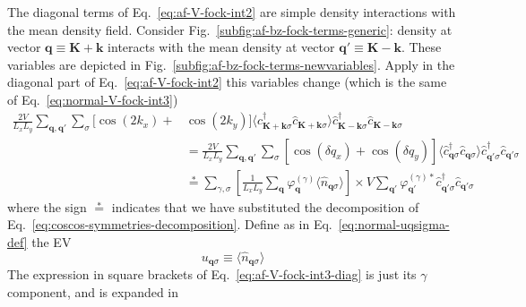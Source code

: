The diagonal terms of Eq.~\eqref{eq:af-V-fock-int2} are simple density interactions with the mean density field. Consider Fig.~\ref{subfig:af-bz-fock-terms-generic}: density at vector $\mathbf{q}\equiv\mathbf{K}+\mathbf{k}$ interacts with the mean density at vector $\mathbf{q}'\equiv\mathbf{K}-\mathbf{k}$. These variables are depicted in Fig.~\ref{subfig:af-bz-fock-terms-newvariables}. Apply in the diagonal part of Eq.~\eqref{eq:af-V-fock-int2} this variables change (which is the same of Eq.~\eqref{eq:normal-V-fock-int3})
\begin{align}
	\frac{2V}{L_x L_y} \sum_{\mathbf{q}, \mathbf{q}'} \sum_\sigma [
		\cos \left(
			2k_x
		\right)	+ &\cos \left(
			2k_y
		\right)	
	] \langle
		\hat c_{\mathbf{K}+\mathbf{k} \sigma}^\dagger 
		\hat c_{\mathbf{K}+\mathbf{k} \sigma}
	\rangle
	\hat c_{\mathbf{K}-\mathbf{k} \sigma}^\dagger \hat c_{\mathbf{K}-\mathbf{k}\sigma} \nonumber \\
	&= \frac{2V}{L_x L_y} \sum_{\mathbf{q}, \mathbf{q}'} \sum_\sigma \left[
		\cos \left( \delta q_x \right) + \cos \left( \delta q_y \right)
	\right] \langle
		\hat c_{\mathbf{q}\sigma}^\dagger \hat c_{\mathbf{q}\sigma} 
	\rangle
	\hat c_{\mathbf{q}'\sigma}^\dagger \hat c_{\mathbf{q}'\sigma}
	\nonumber \\
	&\stackrel{*}{=} \sum_{\gamma,\sigma} \left[
		\frac{1}{L_x L_y} \sum_\mathbf{q} \varphi_\mathbf{q}^{(\gamma)}
		\langle
			\hat n_{\mathbf{q}\sigma}
		\rangle
	\right] \times V
	\sum_{\mathbf{q}'}
	\varphi_{\mathbf{q}'}^{(\gamma)*}
	\hat c_{\mathbf{q}'\sigma}^\dagger
	\hat c_{\mathbf{q}'\sigma} \label{eq:af-V-fock-int3-diag}
\end{align}
where the sign $\stackrel{*}{=}$ indicates that we have substituted the decomposition of Eq.~\eqref{eq:coscos-symmetries-decomposition}. Define as in Eq.~\eqref{eq:normal-uqsigma-def} the EV
\begin{equation}\label{eq:af-uqsigma-def}
	u_{\mathbf{q}\sigma} \equiv \langle
		\hat n_{\mathbf{q}\sigma}
	\rangle
\end{equation}
The expression in square brackets of Eq.~\eqref{eq:af-V-fock-int3-diag} is just its $\gamma$ component, and is expanded in
